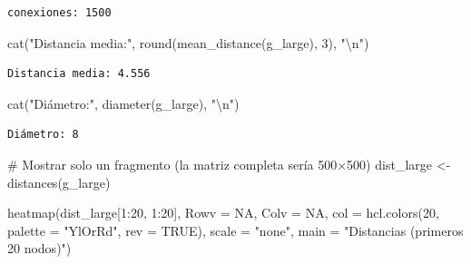 \documentclass[
  letterpaper,
  DIV=11,
  numbers=noendperiod]{scrreprt}
\newenvironment{Shaded}{\begin{snugshade}}{\end{snugshade}}
\newcommand{\AttributeTok}[1]{\textcolor[rgb]{0.40,0.45,0.13}{#1}}
\newcommand{\CommentTok}[1]{\textcolor[rgb]{0.37,0.37,0.37}{#1}}
\newcommand{\ConstantTok}[1]{\textcolor[rgb]{0.56,0.35,0.01}{#1}}
\newcommand{\DecValTok}[1]{\textcolor[rgb]{0.68,0.00,0.00}{#1}}
\newcommand{\FunctionTok}[1]{\textcolor[rgb]{0.28,0.35,0.67}{#1}}
\newcommand{\NormalTok}[1]{\textcolor[rgb]{0.00,0.23,0.31}{#1}}
\newcommand{\OtherTok}[1]{\textcolor[rgb]{0.00,0.23,0.31}{#1}}
\newcommand{\SpecialCharTok}[1]{\textcolor[rgb]{0.37,0.37,0.37}{#1}}
\newcommand{\StringTok}[1]{\textcolor[rgb]{0.13,0.47,0.30}{#1}}
\begin{document}
\begin{verbatim}
conexiones: 1500 
\end{verbatim}

\begin{Shaded}
\begin{Highlighting}[]
\FunctionTok{cat}\NormalTok{(}\StringTok{"Distancia media:"}\NormalTok{, }\FunctionTok{round}\NormalTok{(}\FunctionTok{mean\_distance}\NormalTok{(g\_large), }\DecValTok{3}\NormalTok{), }\StringTok{"}\SpecialCharTok{\textbackslash{}n}\StringTok{"}\NormalTok{)}
\end{Highlighting}
\end{Shaded}

\begin{verbatim}
Distancia media: 4.556 
\end{verbatim}

\begin{Shaded}
\begin{Highlighting}[]
\FunctionTok{cat}\NormalTok{(}\StringTok{"Diámetro:"}\NormalTok{, }\FunctionTok{diameter}\NormalTok{(g\_large), }\StringTok{"}\SpecialCharTok{\textbackslash{}n}\StringTok{"}\NormalTok{)}
\end{Highlighting}
\end{Shaded}

\begin{verbatim}
Diámetro: 8 
\end{verbatim}

\begin{Shaded}
\begin{Highlighting}[]
\CommentTok{\# Mostrar solo un fragmento (la matriz completa sería 500×500)}
\NormalTok{dist\_large }\OtherTok{\textless{}{-}} \FunctionTok{distances}\NormalTok{(g\_large)}

\FunctionTok{heatmap}\NormalTok{(dist\_large[}\DecValTok{1}\SpecialCharTok{:}\DecValTok{20}\NormalTok{, }\DecValTok{1}\SpecialCharTok{:}\DecValTok{20}\NormalTok{],}
        \AttributeTok{Rowv =} \ConstantTok{NA}\NormalTok{, }\AttributeTok{Colv =} \ConstantTok{NA}\NormalTok{,}
        \AttributeTok{col =} \FunctionTok{hcl.colors}\NormalTok{(}\DecValTok{20}\NormalTok{, }\AttributeTok{palette =} \StringTok{"YlOrRd"}\NormalTok{, }\AttributeTok{rev =} \ConstantTok{TRUE}\NormalTok{),}
        \AttributeTok{scale =} \StringTok{"none"}\NormalTok{,}
        \AttributeTok{main =} \StringTok{"Distancias (primeros 20 nodos)"}\NormalTok{)}
\end{Highlighting}
\end{Shaded}
\end{document}
